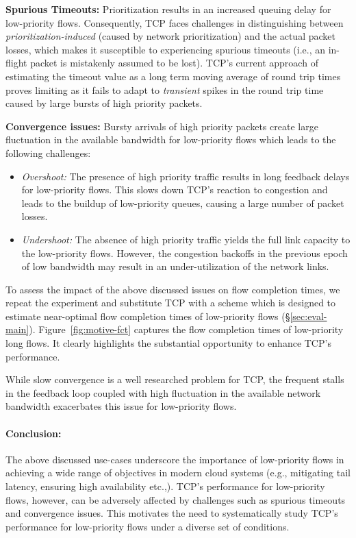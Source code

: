 \textbf{Spurious Timeouts:}
    Prioritization results in an increased queuing delay for low-priority flows. Consequently, TCP faces challenges in distinguishing between \emph{prioritization-induced} (caused by network prioritization) and the actual packet losses, which makes it susceptible to experiencing spurious timeouts (i.e., an in-flight packet is mistakenly assumed to be lost). TCP's current approach of estimating the timeout value as a long term moving average of round trip times proves limiting as it fails to adapt to \emph{transient} spikes in the round trip time caused by large bursts of high priority packets.
    
    \textbf{Convergence issues:}
    Bursty arrivals of high priority packets create large fluctuation in the available bandwidth for low-priority flows which leads to the following challenges:
    \begin{itemize}
        \item \emph{Overshoot:} 
        The presence of high priority traffic results in long feedback delays for low-priority flows. This slows down TCP's reaction to congestion and leads to the buildup of low-priority queues, causing a large number of packet losses.
        \item \emph{Undershoot:} The absence of high priority traffic yields the full link capacity to the low-priority flows. However, the congestion backoffs in the previous epoch of low bandwidth may result in an under-utilization of the network links.
    \end{itemize}

    To assess the impact of the above discussed issues on flow completion times, we repeat the experiment and substitute TCP with a \nearopt{} scheme which is designed to estimate near-optimal flow completion times of low-priority flows (\S\ref{sec:eval-main}).
    Figure~\ref{fig:motive-fct} captures the flow completion times of low-priority long flows. It clearly highlights the substantial opportunity to enhance TCP's performance. 

    While slow convergence is a well researched problem for TCP, the frequent stalls in the feedback loop coupled with high fluctuation in the available network bandwidth exacerbates this issue for low-priority flows.

\paragraph{\textbf{Conclusion:}}
The above discussed use-cases underscore the importance of low-priority flows in achieving a wide range of objectives in modern cloud systems (e.g., mitigating tail latency, ensuring high availability etc.,).
TCP's performance for low-priority flows, however, can be adversely affected by challenges such as spurious timeouts and convergence issues. 
This motivates the need to systematically study TCP's performance for low-priority flows under a diverse set of conditions.